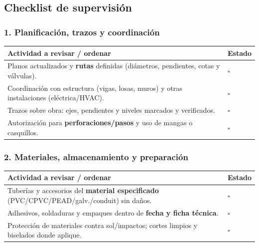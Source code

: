 \documentclass[12pt]{article}
\newcommand{\cbox}{\(\square\)} %
\begin{document}
	
	
	\subsection{Checklist de supervisión}
	
	\subsubsection*{1. Planificación, trazos y coordinación}
	\begin{tabularx}{\linewidth}{>{\raggedright\arraybackslash}p{0.93\linewidth} >{\centering\arraybackslash}m{0.07\linewidth}}
		\toprule
		\textbf{Actividad a revisar / ordenar} & \textbf{Estado}\\
		\midrule
		Planos actualizados y \textbf{rutas} definidas (diámetros, pendientes, cotas y válvulas). & \cbox \\
		Coordinación con estructura (vigas, losas, muros) y otras instalaciones (eléctrica/HVAC). & \cbox \\
		Trazos sobre obra: ejes, pendientes y niveles marcados y verificados. & \cbox \\
		Autorización para \textbf{perforaciones/pasos} y uso de mangas o casquillos. & \cbox \\
		\bottomrule
	\end{tabularx}
	
	\subsubsection*{2. Materiales, almacenamiento y preparación}
	\begin{tabularx}{\linewidth}{>{\raggedright\arraybackslash}p{0.93\linewidth} >{\centering\arraybackslash}m{0.07\linewidth}}
		\toprule
		\textbf{Actividad a revisar / ordenar} & \textbf{Estado}\\
		\midrule
		Tuberías y accesorios del \textbf{material especificado} (PVC/CPVC/PEAD/galv./conduit) sin daños. & \cbox \\
		Adhesivos, soldaduras y empaques dentro de \textbf{fecha y ficha técnica}. & \cbox \\
		Protección de materiales contra sol/impactos; cortes limpios y biselados donde aplique. & \cbox \\
		\bottomrule
	\end{tabularx}
	
\end{document}
